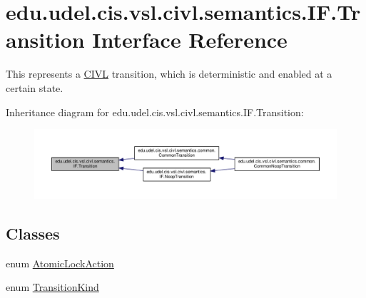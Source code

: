 \hypertarget{interfaceedu_1_1udel_1_1cis_1_1vsl_1_1civl_1_1semantics_1_1IF_1_1Transition}{}\section{edu.\+udel.\+cis.\+vsl.\+civl.\+semantics.\+I\+F.\+Transition Interface Reference}
\label{interfaceedu_1_1udel_1_1cis_1_1vsl_1_1civl_1_1semantics_1_1IF_1_1Transition}


This represents a \hyperlink{classedu_1_1udel_1_1cis_1_1vsl_1_1civl_1_1CIVL}{C\+I\+V\+L} transition, which is deterministic and enabled at a certain state.  




Inheritance diagram for edu.\+udel.\+cis.\+vsl.\+civl.\+semantics.\+I\+F.\+Transition\+:
\nopagebreak
\begin{figure}[H]
\begin{center}
\leavevmode
\includegraphics[width=350pt]{interfaceedu_1_1udel_1_1cis_1_1vsl_1_1civl_1_1semantics_1_1IF_1_1Transition__inherit__graph}
\end{center}
\end{figure}
\subsection*{Classes}
\begin{DoxyCompactItemize}
\item 
enum \hyperlink{enumedu_1_1udel_1_1cis_1_1vsl_1_1civl_1_1semantics_1_1IF_1_1Transition_1_1AtomicLockAction}{Atomic\+Lock\+Action}
\item 
enum \hyperlink{enumedu_1_1udel_1_1cis_1_1vsl_1_1civl_1_1semantics_1_1IF_1_1Transition_1_1TransitionKind}{Transition\+Kind}
\end{DoxyCompactItemize}
